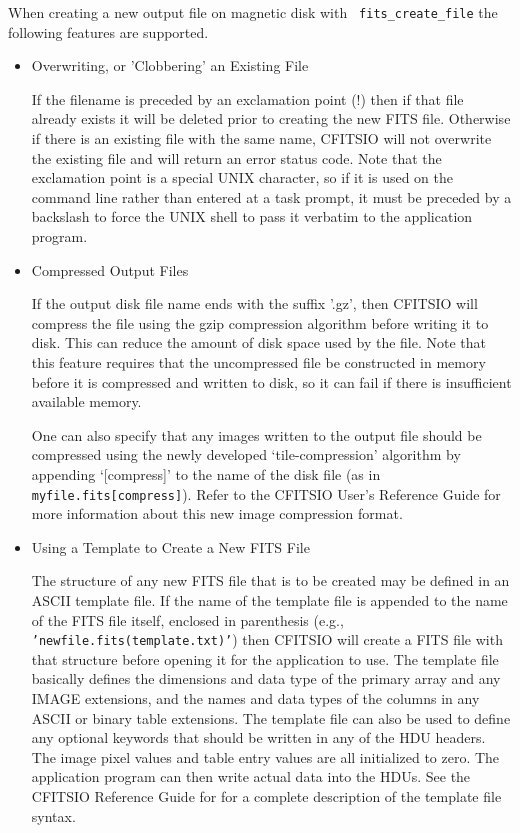 \documentclass[11pt]{article}
\begin{document}
When creating a new output file on magnetic disk  with {\tt
fits\_create\_file} the following features are supported.
\begin{itemize}
\item Overwriting, or 'Clobbering' an Existing File

If the filename is preceded by an exclamation
point (!) then if that file already exists it will be deleted prior to
creating the new FITS file.  Otherwise if there is an existing file
with the same name, CFITSIO will not overwrite the existing file and
will return an error status code.  Note  that the exclamation point is
a special UNIX character, so if it is used on the command line rather
than entered at a task prompt, it must be preceded by a backslash to
force the UNIX shell to pass it verbatim to the application program.

\item Compressed Output Files

If the output disk file name ends with the suffix '.gz', then CFITSIO
will compress the file using the gzip compression algorithm before
writing it to disk.  This can reduce the amount of disk space used by
the file.  Note that this feature requires that the uncompressed file
be constructed in memory before it is compressed and written to disk,
so it can fail if there is insufficient available memory.

One can also specify that any images written to the output file should
be compressed using the newly developed `tile-compression' algorithm by
appending `[compress]' to the name of the disk file (as in
{\tt myfile.fits[compress]}).   Refer to the CFITSIO User's Reference Guide
for more information about this new image compression format.

\item Using a Template to Create a New FITS File

The structure of any new FITS file that is to be created may be defined
in an ASCII template file.  If the name of the template file is
appended to the name of the FITS file itself, enclosed in parenthesis
(e.g., {\tt 'newfile.fits(template.txt)'}) then CFITSIO will create a
FITS file with that structure before opening it for the application to
use.  The template file basically defines the dimensions and data type
of the primary array and any IMAGE extensions, and the names and data
types of the columns in any ASCII or binary table extensions.  The
template file can also be used to define any optional keywords that
should be written in any of the HDU headers.  The image pixel values
and table entry values are all initialized to zero.  The application
program can then write actual data into the HDUs.  See the CFITSIO
Reference Guide for for a complete description of the template file
syntax.


\end{itemize}
\end{document}
